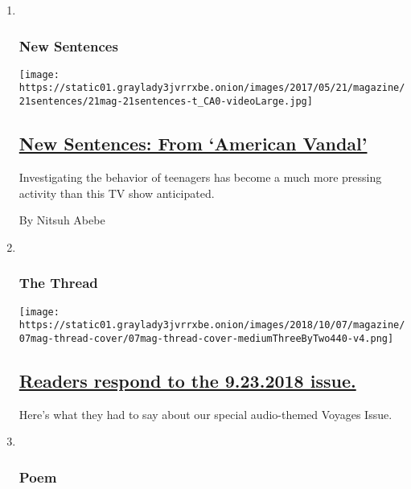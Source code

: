 \begin{enumerate}
\def\labelenumi{\arabic{enumi}.}
\item ~
  \hypertarget{new-sentences}{%
  \subsubsection{New Sentences}\label{new-sentences}}

  \texttt{[image: https://static01.graylady3jvrrxbe.onion/images/2017/05/21/magazine/21sentences/21mag-21sentences-t\_CA0-videoLarge.jpg]}

  \hypertarget{new-sentences-from-american-vandal}{%
  \subsection{\texorpdfstring{\href{/2018/10/04/magazine/new-sentences-from-american-vandal.html}{New
  Sentences: From `American
  Vandal'}}{New Sentences: From `American Vandal'}}\label{new-sentences-from-american-vandal}}

  Investigating the behavior of teenagers has become a much more
  pressing activity than this TV show anticipated.

  By Nitsuh Abebe
\item ~
  \hypertarget{the-thread}{%
  \subsubsection{The Thread}\label{the-thread}}

  \texttt{[image: https://static01.graylady3jvrrxbe.onion/images/2018/10/07/magazine/07mag-thread-cover/07mag-thread-cover-mediumThreeByTwo440-v4.png]}

  \hypertarget{readers-respond-to-the-9232018-issue}{%
  \subsection{\texorpdfstring{\href{/2018/10/05/magazine/readers-respond-to-the-9-23-2018-issue.html}{Readers
  respond to the 9.23.2018
  issue.}}{Readers respond to the 9.23.2018 issue.}}\label{readers-respond-to-the-9232018-issue}}

  Here's what they had to say about our special audio-themed Voyages
  Issue.
\item ~
  \hypertarget{poem}{%
  \subsubsection{Poem}\label{poem}}


\end{enumerate}
